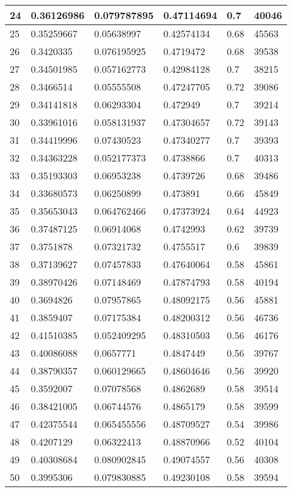\begin{longtable}{|l|l|l|l|l|l|}
24 & 0.36126986 & 0.079787895 & 0.47114694 & 0.7 & 40046 \\ \hline 
25 & 0.35259667 & 0.05638997 & 0.42574134 & 0.68 & 45563 \\ \hline 
26 & 0.3420335 & 0.076195925 & 0.4719472 & 0.68 & 39538 \\ \hline 
27 & 0.34501985 & 0.057162773 & 0.42984128 & 0.7 & 38215 \\ \hline 
28 & 0.3466514 & 0.05555508 & 0.47247705 & 0.72 & 39086 \\ \hline 
29 & 0.34141818 & 0.06293304 & 0.472949 & 0.7 & 39214 \\ \hline 
30 & 0.33961016 & 0.058131937 & 0.47304657 & 0.72 & 39143 \\ \hline 
31 & 0.34419996 & 0.07430523 & 0.47340277 & 0.7 & 39393 \\ \hline 
32 & 0.34363228 & 0.052177373 & 0.4738866 & 0.7 & 40313 \\ \hline 
33 & 0.35193303 & 0.06953238 & 0.4739726 & 0.68 & 39486 \\ \hline 
34 & 0.33680573 & 0.06250899 & 0.473891 & 0.66 & 45849 \\ \hline 
35 & 0.35653043 & 0.064762466 & 0.47373924 & 0.64 & 44923 \\ \hline 
36 & 0.37487125 & 0.06914068 & 0.4742993 & 0.62 & 39739 \\ \hline 
37 & 0.3751878 & 0.07321732 & 0.4755517 & 0.6 & 39839 \\ \hline 
38 & 0.37139627 & 0.07457833 & 0.47640064 & 0.58 & 45861 \\ \hline 
39 & 0.38970426 & 0.07148469 & 0.47874793 & 0.58 & 40194 \\ \hline 
40 & 0.3694826 & 0.07957865 & 0.48092175 & 0.56 & 45881 \\ \hline 
41 & 0.3859407 & 0.07175384 & 0.48200312 & 0.56 & 46736 \\ \hline 
42 & 0.41510385 & 0.052409295 & 0.48310503 & 0.56 & 46176 \\ \hline 
43 & 0.40086088 & 0.0657771 & 0.4847449 & 0.56 & 39767 \\ \hline 
44 & 0.38790357 & 0.060129665 & 0.48604646 & 0.56 & 39920 \\ \hline 
45 & 0.3592007 & 0.07078568 & 0.4862689 & 0.58 & 39514 \\ \hline 
46 & 0.38421005 & 0.06744576 & 0.4865179 & 0.58 & 39599 \\ \hline 
47 & 0.42375544 & 0.065455556 & 0.48709527 & 0.54 & 39986 \\ \hline 
48 & 0.4207129 & 0.06322413 & 0.48870966 & 0.52 & 40104 \\ \hline 
49 & 0.40308684 & 0.080902845 & 0.49074557 & 0.56 & 40308 \\ \hline 
50 & 0.3995306 & 0.079830885 & 0.49230108 & 0.58 & 39594 \\ \hline 
\end{longtable}